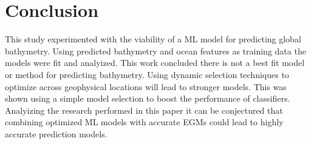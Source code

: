 \section{Conclusion}
\setlength{\parindent}{10ex}
This study experimented with the viability of a \ac{ML} model for predicting global bathymetry.
Using predicted bathymetry and ocean features as training data the models were fit and analyized.
This work concluded there is not a best fit model or method for predicting bathymetry.
Using dynamic selection techniques to optimize across geophysical locations will lead to stronger models.
This was shown using a simple model selection to boost the performance of classifiers.
Analyizing the research performed in this paper it can be conjectured that combining optimized \ac{ML} models with accurate \ac{EGM}s could lead to highly accurate prediction models.
